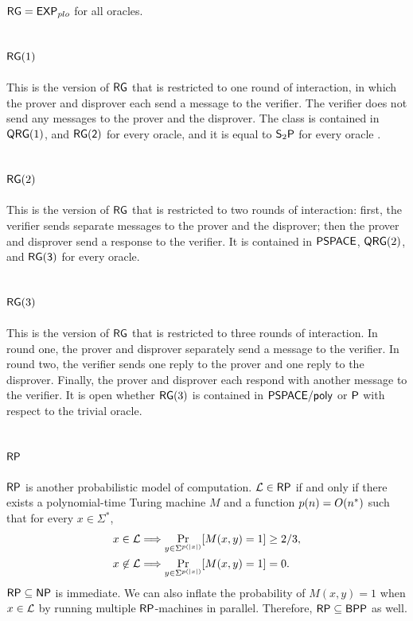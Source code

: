 $\mathsf{RG}=\mathsf{EXP}_{plo}$ for all oracles.

\subsection{$\mathsf{RG}(1)$}

This is the version of $\mathsf{RG}$ that is restricted to one round of 
interaction, in which the prover and disprover 
each send a message to the verifier. The verifier does not send any messages to 
the prover and the disprover. The class is contained in $\mathsf{QRG}(1)$, and 
$\mathsf{RG(2)}$ for every oracle, and it is equal to 
$\mathsf{S}_2\mathsf{P}$ for every oracle \cite{fortnow2008complexity}.

\subsection{$\mathsf{RG}(2)$}

This is the version of $\mathsf{RG}$ that is restricted to two rounds of 
interaction: first, the verifier sends separate 
messages to the prover and the disprover; then the prover and disprover send a 
response to the verifier. It is contained in 
$\mathsf{PSPACE}$, $\mathsf{QRG}(2)$, and $\mathsf{RG(3)}$ for every oracle.

\subsection{$\mathsf{RG}(3)$}

This is the version of $\mathsf{RG}$ that is restricted to three rounds of 
interaction. In round one, the prover and 
disprover separately send a message to the verifier. In round two, the verifier 
sends one reply to the prover and one reply to the disprover. Finally, the prover 
and disprover each respond with another message to the verifier.  It is open 
whether $\mathsf{RG}(3)$ is contained in $\mathsf{PSPACE}/\mathsf{poly}$ or $\mathsf{P}$ with respect 
to the trivial oracle.

\subsection{$\mathsf{RP}$}

$\mathsf{RP}$ is another probabilistic model of computation. $\mathcal{L}\in\mathsf{RP}$ if 
and only if there exists a polynomial-time Turing machine $M$ and a function 
$p(n)=O(n^*)$ such that for every $x\in\Sigma^*$,
\begin{align*}
x\in\mathcal{L}&\Longrightarrow
\Pr_{y\in\Sigma^{p(|x|)}}[M(x,y)=1]\geq 2/3, \\
x\not\in\mathcal{L}&\Longrightarrow
\Pr_{y\in\Sigma^{p(|x|)}}[M(x,y)=1]=0.
\end{align*}
$\mathsf{RP}\subseteq\mathsf{NP}$ is immediate. We can also inflate the probability of 
$M(x,y)=1$ when $x\in\mathcal{L}$ by running multiple $\mathsf{RP}$-machines in parallel. 
Therefore, $\mathsf{RP}\subseteq\mathsf{BPP}$ as well.

